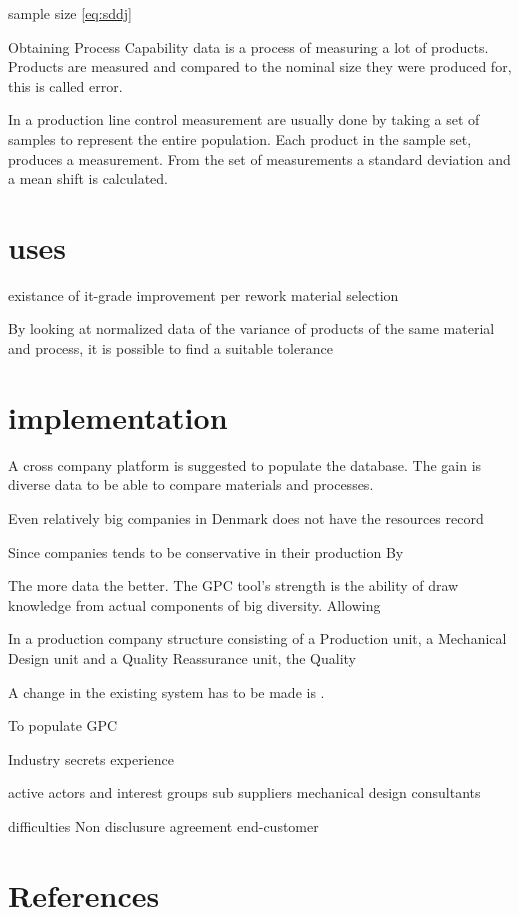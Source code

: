 \documentclass[aip,amsmath, reprint, author-year]{revtex4-1}
\begin{document}
sample size  \ref{eq:sddj}




Obtaining Process Capability data is a process of measuring a lot of products.
Products are measured and compared to the nominal size they were produced for, this is called error.

In a production line control measurement are usually done by taking a set of samples to represent the entire population. Each product in the sample set, produces a measurement. From the set of measurements a standard deviation and a mean shift is calculated.

\section{uses}
existance of it-grade
improvement per rework
material selection





By looking at normalized data of the variance of products of the same material and process, it is possible to find a suitable tolerance

\section{implementation}





A cross company platform is suggested to populate the database. The gain is diverse data to be able to compare materials and processes. 

Even relatively big companies in Denmark does not have the resources record 

Since companies tends to be conservative in their production 
By 

The more data the better. The GPC tool's strength is the ability of draw knowledge from actual components of big diversity. Allowing  

In a production company structure consisting of a Production unit, a Mechanical Design unit and a Quality Reassurance unit, the Quality 

A change in the existing system has to be made is .
 



To populate GPC 

Industry secrets
	experience
	
	
active actors and interest groups
	sub suppliers 
	mechanical design consultants
	

difficulties
	Non disclusure agreement
	end-customer
	

\section*{References}

\end{document}
